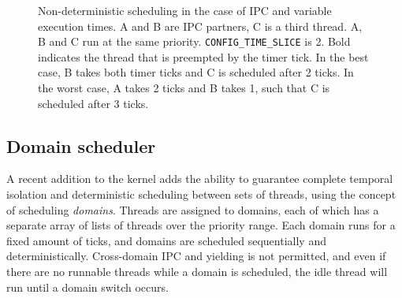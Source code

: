 \begin{figure}
    \centering
    \caption{Non-deterministic scheduling in the case of IPC and variable execution times. A and B are IPC partners, C is a third thread. A, B and C run at the same priority. \texttt{CONFIG\_TIME\_SLICE} is 2. Bold indicates the thread that is preempted by the timer tick. In the best case, B takes both timer ticks and C is scheduled after 2 ticks. In the worst case, A takes 2 ticks and B takes 1, such that C is scheduled after 3 ticks.}
    \label{fig:non-determinism}
\end{figure}

\subsection{Domain scheduler}

A recent addition to the \selfour kernel adds the ability to guarantee complete temporal isolation and deterministic scheduling between sets of threads, using the concept of scheduling \emph{domains}.
Threads are assigned to domains, each of which has a separate array of lists of threads over the priority range.
Each domain runs for a fixed amount of ticks, and domains are scheduled sequentially and deterministically.
Cross-domain \gls{IPC} and yielding is not permitted, and even if there are no runnable threads while a domain is scheduled, the idle thread will run until a domain switch occurs.

